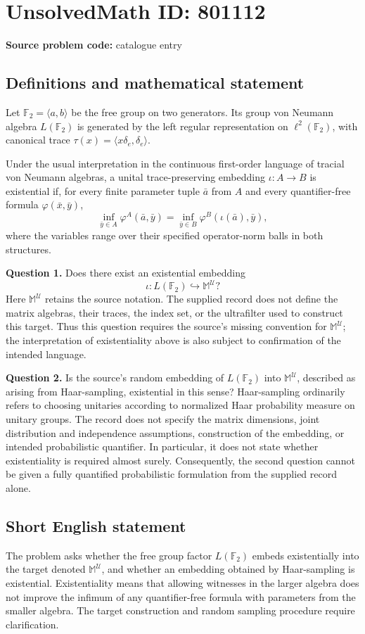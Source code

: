 \documentclass[11pt]{article}
\begin{document}
\section*{UnsolvedMath ID: 801112}
\textbf{Source problem code:} catalogue entry
\subsection{Definitions and mathematical statement}
Let \(\mathbb F_2=\langle a,b\rangle\) be the free group on two generators. Its group von Neumann algebra \(L(\mathbb F_2)\) is generated by the left regular representation on \(\ell^2(\mathbb F_2)\), with canonical trace \(\tau(x)=\langle x\delta_e,\delta_e\rangle\).

Under the usual interpretation in the continuous first-order language of tracial von Neumann algebras, a unital trace-preserving embedding \(\iota:A\to B\) is existential if, for every finite parameter tuple \(\bar a\) from \(A\) and every quantifier-free formula \(\varphi(\bar x,\bar y)\),
\[
\inf_{\bar y\in A}\varphi^A(\bar a,\bar y)
=
\inf_{\bar y\in B}\varphi^B(\iota(\bar a),\bar y),
\]
where the variables range over their specified operator-norm balls in both structures.

\textbf{Question 1.} Does there exist an existential embedding
\[
\iota:L(\mathbb F_2)\hookrightarrow\mathbb M^{\mathcal U}?
\]
Here \(\mathbb M^{\mathcal U}\) retains the source notation. The supplied record does not define the matrix algebras, their traces, the index set, or the ultrafilter used to construct this target. Thus this question requires the source's missing convention for \(\mathbb M^{\mathcal U}\); the interpretation of existentiality above is also subject to confirmation of the intended language.

\textbf{Question 2.} Is the source's random embedding of \(L(\mathbb F_2)\) into \(\mathbb M^{\mathcal U}\), described as arising from Haar-sampling, existential in this sense? Haar-sampling ordinarily refers to choosing unitaries according to normalized Haar probability measure on unitary groups. The record does not specify the matrix dimensions, joint distribution and independence assumptions, construction of the embedding, or intended probabilistic quantifier. In particular, it does not state whether existentiality is required almost surely. Consequently, the second question cannot be given a fully quantified probabilistic formulation from the supplied record alone.
\subsection{Short English statement}
The problem asks whether the free group factor \(L(\mathbb F_2)\) embeds existentially into the target denoted \(\mathbb M^{\mathcal U}\), and whether an embedding obtained by Haar-sampling is existential. Existentiality means that allowing witnesses in the larger algebra does not improve the infimum of any quantifier-free formula with parameters from the smaller algebra. The target construction and random sampling procedure require clarification.
\end{document}
